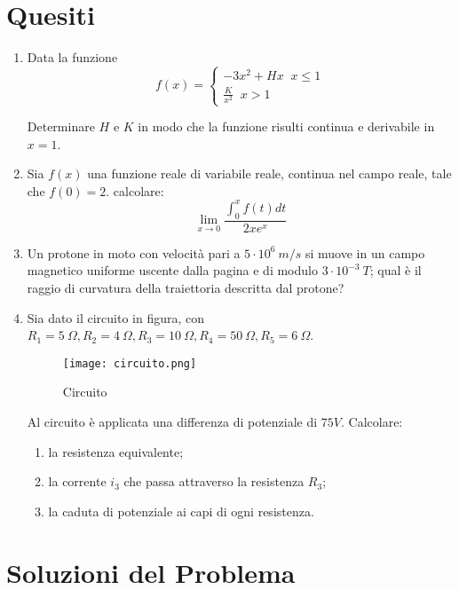 \documentclass[a4paper,12pt]{article}
\begin{document}
\section{Quesiti}
\begin{enumerate}
\item Data la funzione
\begin{equation} f(x)=
\left\{
\begin{array}{l}
 -3x^2+Hx\;\; x \le 1\\ \frac{K}{x^2}\;\; x>1
\end{array}
\right.
\end{equation}

Determinare $H$ e $K$ in modo che la funzione risulti continua e derivabile in $x=1$.

\item  Sia $f(x)$ una funzione reale di variabile reale, continua nel campo reale, tale che $f(0) = 2$. calcolare: $$\lim_{x\rightarrow 0}\frac{\int_{0}^x f(t)dt}{2xe^x}$$
\item Un protone in moto con velocità pari a $5\cdot10^6\ m/s$ si muove in un campo magnetico uniforme uscente dalla pagina e di modulo $3\cdot10^{-3}\ T$; qual è il raggio di curvatura della traiettoria descritta dal protone?
\item Sia dato il circuito in figura, con $R_1 = 5\ \Omega, R_2 = 4\ \Omega, R_3 = 10\ \Omega, R_4 = 50\ \Omega,  R_5 = 6\ \Omega$.

\begin{figure}[H]
\centering
\texttt{[image: circuito.png]}
\caption {Circuito}
\end{figure}
Al circuito è applicata una differenza di potenziale di $75 V$.  Calcolare:
\begin{enumerate}
\item la resistenza equivalente;
\item la corrente $i_3$ che passa attraverso la resistenza $R_3$;
\item la caduta di potenziale ai capi di ogni resistenza.
\end{enumerate}
\end{enumerate}

\newpage
\section{Soluzioni del Problema}
\end{document}
